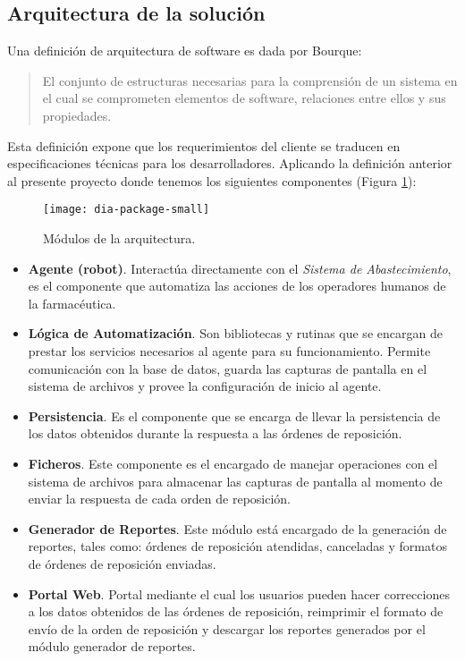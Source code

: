 \subsection{Arquitectura de la solución}
Una definición de arquitectura de software es dada por Bourque\cite{SWEBOOK}:
\begin{quote}
El conjunto de estructuras necesarias para la comprensión de un sistema en el cual se comprometen elementos de software, relaciones entre ellos y sus propiedades.
\end{quote}
Esta definición expone que los requerimientos del cliente se traducen en especificaciones técnicas para los desarrolladores. Aplicando la definición anterior al presente proyecto donde tenemos los siguientes componentes (Figura \ref{fig:dia-package-small}):
\begin{figure}[h]
\centering
\texttt{[image: dia-package-small]} 
\caption{Módulos de la arquitectura.}
\label{fig:dia-package-small}
\end{figure}
\begin{itemize}
\item \textbf{Agente (robot)}. Interactúa directamente con el \textit{Sistema de Abastecimiento}, es el componente que automatiza las acciones de los operadores humanos de la farmacéutica.
\item \textbf{Lógica de Automatización}. Son bibliotecas y rutinas que se encargan de prestar los servicios necesarios al agente para su funcionamiento. Permite comunicación con la base de datos, guarda las capturas de pantalla en el sistema de archivos y provee la configuración de inicio al agente.
\item \textbf{Persistencia}. Es el componente que se encarga de llevar la persistencia de los datos obtenidos durante la respuesta a las órdenes de reposición.
\item \textbf{Ficheros}. Este componente es el encargado de manejar operaciones con el sistema de archivos para almacenar las capturas de pantalla al momento de enviar la respuesta de cada orden de reposición.
\item \textbf{Generador de Reportes}. Este módulo está encargado de la generación de reportes, tales como: órdenes de reposición atendidas, canceladas y formatos de órdenes de reposición enviadas.
\item \textbf{Portal Web}. Portal mediante el cual los usuarios pueden hacer correcciones a los datos obtenidos de las órdenes de reposición, reimprimir el formato de envío de la orden de reposición  y descargar los reportes generados por el módulo generador de reportes.
\end{itemize}

